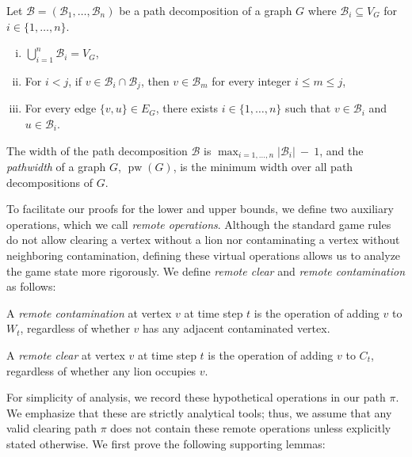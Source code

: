 \documentclass[a4paper,UKenglish,cleveref, autoref, thm-restate]{lipics-v2021}
\begin{document}
\begin{proposition}\label{prop:pw-basics}
Let $\mathcal{B}=(\mathcal{B}_1, \dots, \mathcal{B}_n)$ be a path decomposition of a graph $G$ where $\mathcal{B}_i\subseteq V_G$ for $i\in \{1, \dots, n\}$.
\begin{enumerate}[(i)]
  \item\label{prop:pw-basics:i} $\bigcup_{i=1}^n \mathcal{B}_i = V_G$,
  \item\label{prop:pw-basics:ii} For $i < j$, if $v \in \mathcal{B}_i \cap \mathcal{B}_j$, then $v \in \mathcal{B}_m$ for every integer $i \leq m \leq j$,
  \item\label{prop:pw-basics:iii} For every edge $\{v, u\} \in E_G$, there exists $i\in\{1,\dots,n\}$ such that $v \in \mathcal{B}_i$ and $u \in \mathcal{B}_i$.
\end{enumerate}
\end{proposition}
The width of the path decomposition $\mathcal{B}$ is $\max_{i=1,\dots, n}|\mathcal{B}_{i}|~-~1$, and the \emph{pathwidth} of a graph $G$, $\operatorname{pw}(G)$, is the minimum width over all path decompositions of $G$.

To facilitate our proofs for the lower and upper bounds, we define two auxiliary operations, which we call \emph{remote operations}. Although the standard game rules do not allow clearing a vertex without a lion nor contaminating a vertex without neighboring contamination, defining these virtual operations allows us to analyze the game state more rigorously. We define \emph{remote clear} and \emph{remote contamination} as follows:
\begin{definition}
    A \emph{remote contamination} at vertex $v$ at time step $t$ is the operation of adding $v$ to $W_t$, regardless of whether $v$ has any adjacent contaminated vertex.
\end{definition}
\begin{definition}
    A \emph{remote clear} at vertex $v$ at time step $t$ is the operation of adding $v$ to $C_t$, regardless of whether any lion occupies $v$.
\end{definition}

For simplicity of analysis, we record these hypothetical operations in our path $\pi$. We emphasize that these are strictly analytical tools; thus, we assume that any valid clearing path $\pi$ does not contain these remote operations unless explicitly stated otherwise. We first prove the following supporting lemmas:
\end{document}
